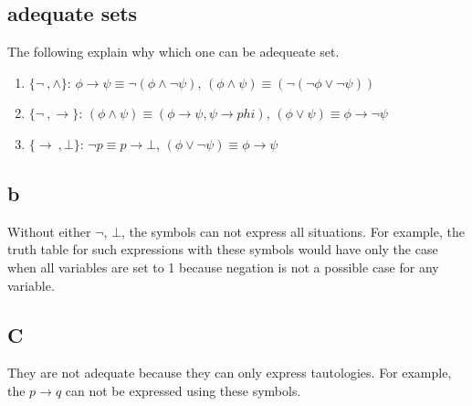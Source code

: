 \documentclass[11pt,leqno,fleqn]{article}
\newcommand{\Intro}[1]{{#1}{\textrm{i}}}
\begin{document}
\subsection{adequate sets}
   The following explain why which one can be adequeate set.
\begin{enumerate}
   \item $\{\lnot \ , \land\}$: $\phi \to \psi \equiv \lnot (\phi \land \lnot \psi)$, $ ( \phi \land \psi ) \equiv (\lnot (\lnot \phi \lor \lnot \psi)) $
   \item $\{\lnot \ , \to\}$: $(\phi \land \psi) \equiv (\phi \to \psi, \psi \to phi)$,  $(\phi \lor \psi) \equiv \phi \to \lnot \psi$
   \item $\{\to \ , \bot\}$: $\lnot p \equiv p \to \bot $, $(\phi \lor \lnot \psi) \equiv \phi \to \psi$ 
\end{enumerate}

\subsection{b}
Without either $\lnot$, $\bot$, the symbols can not express all situations. For example, the truth table for such expressions with these symbols would have only the case when all variables are set to 1 because negation is not a possible case for any variable.

\subsection{C}
They are not adequate because they can only express tautologies. For example, the $p \to q$ can not be expressed using these symbols.




\end{document}

